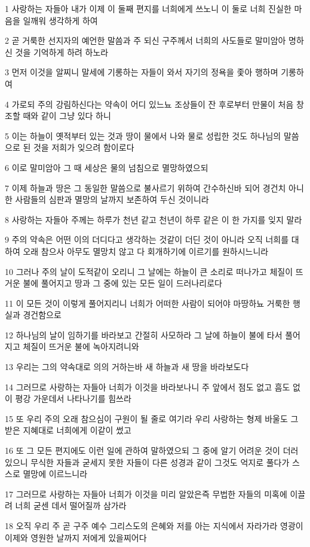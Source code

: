 \par 1 사랑하는 자들아 내가 이제 이 둘째 편지를 너희에게 쓰노니 이 둘로 너희 진실한 마음을 일깨워 생각하게 하여
\par 2 곧 거룩한 선지자의 예언한 말씀과 주 되신 구주께서 너희의 사도들로 말미암아 명하신 것을 기억하게 하려 하노라
\par 3 먼저 이것을 알찌니 말세에 기롱하는 자들이 와서 자기의 정욕을 좇아 행하며 기롱하여
\par 4 가로되 주의 강림하신다는 약속이 어디 있느뇨 조상들이 잔 후로부터 만물이 처음 창조할 때와 같이 그냥 있다 하니
\par 5 이는 하늘이 옛적부터 있는 것과 땅이 물에서 나와 물로 성립한 것도 하나님의 말씀으로 된 것을 저희가 잊으려 함이로다
\par 6 이로 말미암아 그 때 세상은 물의 넘침으로 멸망하였으되
\par 7 이제 하늘과 땅은 그 동일한 말씀으로 불사르기 위하여 간수하신바 되어 경건치 아니한 사람들의 심판과 멸망의 날까지 보존하여 두신 것이니라
\par 8 사랑하는 자들아 주께는 하루가 천년 같고 천년이 하루 같은 이 한 가지를 잊지 말라
\par 9 주의 약속은 어떤 이의 더디다고 생각하는 것같이 더딘 것이 아니라 오직 너희를 대하여 오래 참으사 아무도 멸망치 않고 다 회개하기에 이르기를 원하시느니라
\par 10 그러나 주의 날이 도적같이 오리니 그 날에는 하늘이 큰 소리로 떠나가고 체질이 뜨거운 불에 풀어지고 땅과 그 중에 있는 모든 일이 드러나리로다
\par 11 이 모든 것이 이렇게 풀어지리니 너희가 어떠한 사람이 되어야 마땅하뇨 거룩한 행실과 경건함으로
\par 12 하나님의 날이 임하기를 바라보고 간절히 사모하라 그 날에 하늘이 불에 타서 풀어지고 체질이 뜨거운 불에 녹아지려니와
\par 13 우리는 그의 약속대로 의의 거하는바 새 하늘과 새 땅을 바라보도다
\par 14 그러므로 사랑하는 자들아 너희가 이것을 바라보나니 주 앞에서 점도 없고 흠도 없이 평강 가운데서 나타나기를 힘쓰라
\par 15 또 우리 주의 오래 참으심이 구원이 될 줄로 여기라 우리 사랑하는 형제 바울도 그 받은 지혜대로 너희에게 이같이 썼고
\par 16 또 그 모든 편지에도 이런 일에 관하여 말하였으되 그 중에 알기 어려운 것이 더러 있으니 무식한 자들과 굳세지 못한 자들이 다른 성경과 같이 그것도 억지로 풀다가 스스로 멸망에 이르느니라
\par 17 그러므로 사랑하는 자들아 너희가 이것을 미리 알았은즉 무법한 자들의 미혹에 이끌려 너희 굳센 데서 떨어질까 삼가라
\par 18 오직 우리 주 곧 구주 예수 그리스도의 은혜와 저를 아는 지식에서 자라가라 영광이 이제와 영원한 날까지 저에게 있을찌어다


